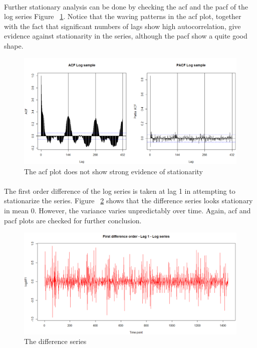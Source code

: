 \documentclass[12pt]{article}
\begin{document}
\paragraph{}
Further stationary analysis can be done by checking the acf and the pacf of the log series Figure ~\ref{fig:figure5}. Notice that the waving patterns in the acf plot, together with the fact that significant numbers of lags show high autocorrelation, give evidence against stationarity in the series, although the pacf show a quite good shape. 
\begin{figure}[H]
  \includegraphics[width=\linewidth]{figure5.png}
  \caption{The acf plot does not show strong evidence of stationarity}
  \label{fig:figure5}
\end{figure}

\paragraph{}
The first order difference of the log series is taken at lag 1 in attempting to stationarize the series. Figure ~\ref{fig:figure6}  shows that the difference series looks stationary in mean 0. However, the variance varies unpredictably over time. Again, acf and pacf plots are checked for further conclusion.
\begin{figure}[H]
  \includegraphics[width=\linewidth]{figure6.png}
  \caption{The difference series}
  \label{fig:figure6}
\end{figure}
\end{document}
